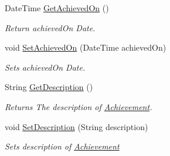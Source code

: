 \begin{DoxyCompactItemize}
Date\+Time \hyperlink{classcom_1_1shephertz_1_1app42_1_1paas_1_1sdk_1_1csharp_1_1achievement_1_1_achievement_aa49674535e6314bbdddbed7465aa3dc5}{Get\+Achieved\+On} ()
\begin{DoxyCompactList}\small\item\em Return achieved\+On Date. \end{DoxyCompactList}\item 
void \hyperlink{classcom_1_1shephertz_1_1app42_1_1paas_1_1sdk_1_1csharp_1_1achievement_1_1_achievement_af9b6b7c99558e4465c9f19807e9e1740}{Set\+Achieved\+On} (Date\+Time achieved\+On)
\begin{DoxyCompactList}\small\item\em Sets achieved\+On Date. \end{DoxyCompactList}\item 
String \hyperlink{classcom_1_1shephertz_1_1app42_1_1paas_1_1sdk_1_1csharp_1_1achievement_1_1_achievement_a9427b32ecee8f8f0891cc894b1e65b70}{Get\+Description} ()
\begin{DoxyCompactList}\small\item\em Returns The description of \hyperlink{classcom_1_1shephertz_1_1app42_1_1paas_1_1sdk_1_1csharp_1_1achievement_1_1_achievement}{Achievement}. \end{DoxyCompactList}\item 
void \hyperlink{classcom_1_1shephertz_1_1app42_1_1paas_1_1sdk_1_1csharp_1_1achievement_1_1_achievement_a24690138942eb3d1c51f457a65ba0f91}{Set\+Description} (String description)
\begin{DoxyCompactList}\small\item\em Sets description of \hyperlink{classcom_1_1shephertz_1_1app42_1_1paas_1_1sdk_1_1csharp_1_1achievement_1_1_achievement}{Achievement} \end{DoxyCompactList}\end{DoxyCompactItemize}
